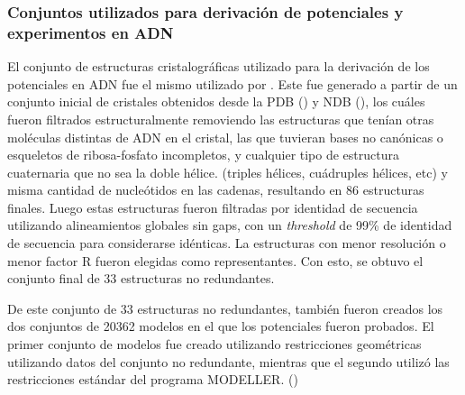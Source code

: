 \subsubsection{Conjuntos utilizados para derivación de potenciales y experimentos en ADN}
\par
El conjunto de estructuras cristalográficas utilizado para la derivación de los potenciales en ADN fue el mismo utilizado por \cite{Ibarra2013}.
Este fue generado a partir de un conjunto inicial de cristales obtenidos desde la PDB (\cite{Berman2000}) y NDB (\cite{Berman1996}), los cuáles fueron filtrados estructuralmente removiendo las estructuras que tenían otras moléculas distintas de ADN en el cristal, las que tuvieran bases no canónicas o esqueletos de ribosa-fosfato incompletos, y cualquier tipo de estructura cuaternaria que no sea la doble hélice. (triples hélices, cuádruples hélices, etc) y misma cantidad de nucleótidos en las cadenas, resultando en 86 estructuras finales.
Luego estas estructuras fueron filtradas por identidad de secuencia utilizando alineamientos globales sin gaps, con un \textit{threshold} de 99\% de identidad de secuencia para considerarse idénticas. La estructuras con menor resolución o menor factor R fueron elegidas como representantes. Con esto, se obtuvo el conjunto final de 33 estructuras no redundantes.
\par
De este conjunto de 33 estructuras no redundantes, también fueron creados los dos conjuntos de 20362 modelos en el que los potenciales fueron probados.
El primer conjunto de modelos fue creado utilizando restricciones geométricas utilizando datos del conjunto no redundante, mientras que el segundo utilizó las restricciones estándar del programa MODELLER. (\cite{Ibarra2013})
